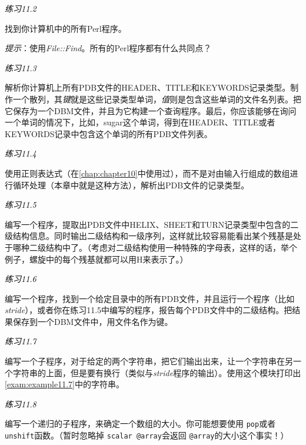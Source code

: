 \textcolor{black}{\textit{练习11.2}}
\begin{adjustwidth}{4em}{}
找到你计算机中的所有Perl程序。

\textit{提示}：使用\textit{File::Find}。所有的Perl程序都有什么共同点？
\end{adjustwidth}

\textcolor{black}{\textit{练习11.3}}
\begin{adjustwidth}{4em}{}
  解析你计算机上所有PDB文件的HEADER、TITLE和KEYWORDS记录类型。制作一个散列，其\textit{键}就是这些记录类型单词，\textit{值}则是包含这些单词的文件名列表。把它保存为一个DBM文件，并且为它构建一个查询程序。最后，你应该能够在询问一个单词的情况下，比如，sugar这个单词，得到在HEADER、TITLE或者KEYWORDS记录中包含这个单词的所有PDB文件列表。
\end{adjustwidth}

\textcolor{black}{\textit{练习11.4}}
\begin{adjustwidth}{4em}{}
使用正则表达式（在\autoref{chap:chapter10}中使用过），而不是对由输入行组成的数组进行循环处理（本章中就是这种方法），解析出PDB文件的记录类型。
\end{adjustwidth}

\textcolor{black}{\textit{练习11.5}}
\begin{adjustwidth}{4em}{}
编写一个程序，提取出PDB文件中HELIX、SHEET和TURN记录类型中包含的二级结构信息。同时输出二级结构和一级序列，这样就比较容易能看出某个残基是处于哪种二级结构中了。（考虑对二级结构使用一种特殊的字母表，这样的话，举个例子，螺旋中的每个残基就都可以用H来表示了。）
\end{adjustwidth}

\textcolor{black}{\textit{练习11.6}}
\begin{adjustwidth}{4em}{}
编写一个程序，找到一个给定目录中的所有PDB文件，并且运行一个程序（比如\textit{stride}），或者你在练习11.5中编写的程序，报告每个PDB文件中的二级结构。把结果保存到一个DBM文件中，用文件名作为键。
\end{adjustwidth}

\textcolor{black}{\textit{练习11.7}}
\begin{adjustwidth}{4em}{}
编写一个子程序，对于给定的两个字符串，把它们输出出来，让一个字符串在另一个字符串的上面，但是要有换行（类似与\textit{stride}程序的输出）。使用这个模块打印出\autoref{exam:example11.7}中的字符串。
\end{adjustwidth}

\textcolor{black}{\textit{练习11.8}}
\begin{adjustwidth}{4em}{}
编写一个递归的子程序，来确定一个数组的大小。你可能想要使用 \verb|pop|或者 \verb|unshift|函数。（暂时忽略掉 \verb|scalar @array|会返回 \verb|@array|的大小这个事实！）
\end{adjustwidth}

